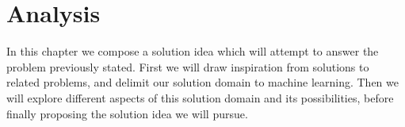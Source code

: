 \chapter{Analysis}\label{chap:analysis}

In this chapter we compose a solution idea which will attempt to answer the problem previously stated. First we will draw inspiration from solutions to related problems, and delimit our solution domain to machine learning. Then we will explore different aspects of this solution domain and its possibilities, before finally proposing the solution idea we will pursue.






